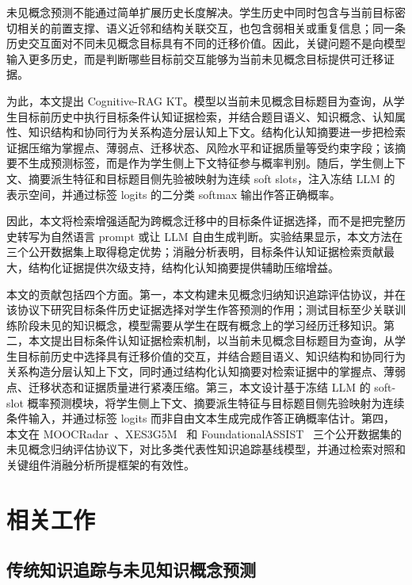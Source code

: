 \documentclass[UTF8,a4paper,12pt]{ctexart}
\numberwithin{table}{section}
\begin{document}
未见概念预测不能通过简单扩展历史长度解决。学生历史中同时包含与当前目标密切相关的前置支撑、语义近邻和结构关联交互，也包含弱相关或重复信息；同一条历史交互面对不同未见概念目标具有不同的迁移价值。因此，关键问题不是向模型输入更多历史，而是判断哪些目标前交互能够为当前未见概念目标提供可迁移证据。

为此，本文提出 Cognitive-RAG KT。模型以当前未见概念目标题目为查询，从学生目标前历史中执行目标条件认知证据检索，并结合题目语义、知识概念、认知属性、知识结构和协同行为关系构造分层认知上下文。结构化认知摘要进一步把检索证据压缩为掌握点、薄弱点、迁移状态、风险水平和证据质量等受约束字段；该摘要不生成预测标签，而是作为学生侧上下文特征参与概率判别。随后，学生侧上下文、摘要派生特征和目标题目侧先验被映射为连续 soft slots，注入冻结 LLM 的表示空间，并通过标签 logits 的二分类 softmax 输出作答正确概率。

因此，本文将检索增强适配为跨概念迁移中的目标条件证据选择，而不是把完整历史转写为自然语言 prompt 或让 LLM 自由生成判断。实验结果显示，本文方法在三个公开数据集上取得稳定优势；消融分析表明，目标条件认知证据检索贡献最大，结构化证据提供次级支持，结构化认知摘要提供辅助压缩增益。


本文的贡献包括四个方面。第一，本文构建未见概念归纳知识追踪评估协议，并在该协议下研究目标条件历史证据选择对学生作答预测的作用；测试目标至少关联训练阶段未见的知识概念，模型需要从学生在既有概念上的学习经历迁移知识。第二，本文提出目标条件认知证据检索机制，以当前未见概念目标题目为查询，从学生目标前历史中选择具有迁移价值的交互，并结合题目语义、知识结构和协同行为关系构造分层认知上下文，同时通过结构化认知摘要对检索证据中的掌握点、薄弱点、迁移状态和证据质量进行紧凑压缩。第三，本文设计基于冻结 LLM 的 soft-slot 概率预测模块，将学生侧上下文、摘要派生特征与目标题目侧先验映射为连续条件输入，并通过标签 logits 而非自由文本生成完成作答正确概率估计。第四，本文在 MOOCRadar~\citep{yu2023moocradar}、XES3G5M~\citep{liu2023xes3g5m} 和 FoundationalASSIST~\citep{worden2026foundationalassist} 三个公开数据集的未见概念归纳评估协议下，对比多类代表性知识追踪基线模型，并通过检索对照和关键组件消融分析所提框架的有效性。

\section{相关工作}

\subsection{传统知识追踪与未见知识概念预测}
\end{document}
